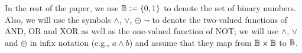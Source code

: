 
In the rest of the paper, we use $\mathbb{B}:=\{0,1\}$ to denote the set of binary numbers. Also, we will use the symbols $\land$, $\lor$, $\oplus$ $\neg$ to denote the two-valued functions of AND, OR and XOR as well as the one-valued function of NOT; we will use $\land$, $\lor$ and $\oplus$ in infix notation (e.g., $a \land b$) and assume that they map from $\mathbb{B} \times \mathbb{B}$ to $\mathbb{B}$.
